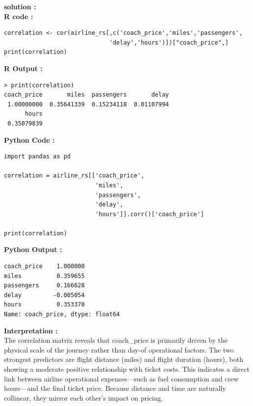 \documentclass[11pt,a4paper]{article}
\begin{document}
\vspace{1em}
\noindent \textbf{solution :}\\
\noindent\textbf{R code :}
\begin{codebox}
\begin{lstlisting}[style=Rstyle]
correlation <- cor(airline_rs[,c('coach_price','miles','passengers',
                              'delay','hours')])["coach_price",]
print(correlation)
\end{lstlisting}
\end{codebox}
\vspace{0.5em}
\noindent \textbf{R Output :}
\begin{verbatim}
> print(correlation)
coach_price       miles  passengers       delay 
 1.00000000  0.35641339  0.15234118  0.01107994 
      hours 
 0.35079839

\end{verbatim}
\vspace{0.5em}
\noindent \textbf{Python Code :}
\begin{codebox}
\begin{lstlisting}[style=Pythonstyle]
import pandas as pd

correlation = airline_rs[['coach_price',
                          'miles',
                          'passengers',
                          'delay',
                          'hours']].corr()['coach_price']

print(correlation)
\end{lstlisting}
\end{codebox}
\vspace{0.5em}
\noindent \textbf{Python Output :}
\begin{verbatim}
coach_price    1.000000
miles          0.359655
passengers     0.166628
delay         -0.005054
hours          0.353370
Name: coach_price, dtype: float64
\end{verbatim}
\vspace{0.5em}

\noindent \textbf{Interpretation :} \\
 The correlation matrix reveals that coach\_price is primarily driven by the physical scale of the journey rather than day-of operational factors. The two strongest predictors are flight distance (miles) and flight duration (hours), both showing a moderate positive relationship with ticket costs. This indicates a direct link between airline operational expenses—such as fuel consumption and crew hours—and the final ticket price. Because distance and time are naturally collinear, they mirror each other's impact on pricing.
\end{document}
